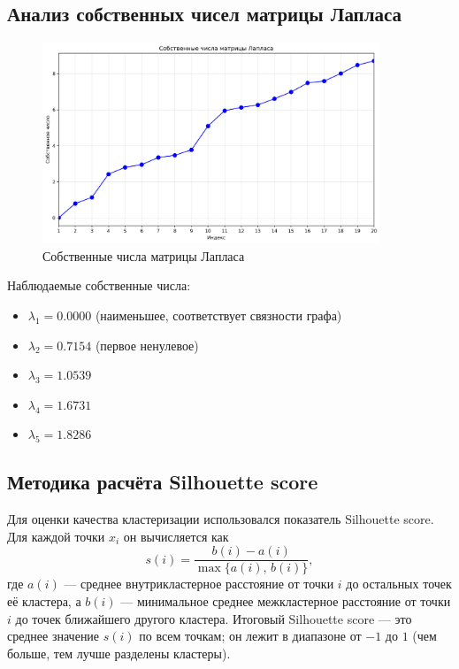 \subsection*{Анализ собственных чисел матрицы Лапласа}

\begin{figure}[H]
    \centering
    \includegraphics[width=0.9\textwidth]{images/task1/eigenvalues.png}
    \caption{Собственные числа матрицы Лапласа}
\end{figure}

Наблюдаемые собственные числа:
\begin{itemize}
    \item $\lambda_1 = 0.0000$ (наименьшее, соответствует связности графа)
    \item $\lambda_2 = 0.7154$ (первое ненулевое)
    \item $\lambda_3 = 1.0539$
    \item $\lambda_4 = 1.6731$
    \item $\lambda_5 = 1.8286$
\end{itemize}

\subsection*{Методика расчёта Silhouette score}

Для оценки качества кластеризации использовался показатель Silhouette score. Для каждой точки $x_i$ он вычисляется как
\[
 s(i) = \frac{b(i) - a(i)}{\max\{a(i), \, b(i)\}},
\]
где $a(i)$ — среднее внутрикластерное расстояние от точки $i$ до остальных точек её кластера, а $b(i)$ — минимальное среднее межкластерное расстояние от точки $i$ до точек ближайшего другого кластера. Итоговый Silhouette score — это среднее значение $s(i)$ по всем точкам; он лежит в диапазоне от $-1$ до $1$ (чем больше, тем лучше разделены кластеры).

